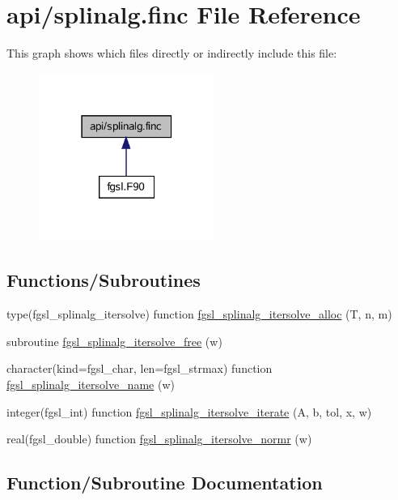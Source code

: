 \hypertarget{splinalg_8finc}{}\section{api/splinalg.finc File Reference}
\label{splinalg_8finc}
This graph shows which files directly or indirectly include this file\+:\nopagebreak
\begin{figure}[H]
\begin{center}
\leavevmode
\includegraphics[width=162pt]{splinalg_8finc__dep__incl}
\end{center}
\end{figure}
\subsection*{Functions/\+Subroutines}
\begin{DoxyCompactItemize}
\item 
type(fgsl\+\_\+splinalg\+\_\+itersolve) function \hyperlink{splinalg_8finc_a8766250bd608e07c616631f63aa4f7d4}{fgsl\+\_\+splinalg\+\_\+itersolve\+\_\+alloc} (T, n, m)
\item 
subroutine \hyperlink{splinalg_8finc_af5c33fc65867faccfca3d77d97bf09c6}{fgsl\+\_\+splinalg\+\_\+itersolve\+\_\+free} (w)
\item 
character(kind=fgsl\+\_\+char, len=fgsl\+\_\+strmax) function \hyperlink{splinalg_8finc_aff2a34f59337673c4505ea7da7d1b231}{fgsl\+\_\+splinalg\+\_\+itersolve\+\_\+name} (w)
\item 
integer(fgsl\+\_\+int) function \hyperlink{splinalg_8finc_a733e162fdb2fc23316909d59f028846e}{fgsl\+\_\+splinalg\+\_\+itersolve\+\_\+iterate} (A, b, tol, x, w)
\item 
real(fgsl\+\_\+double) function \hyperlink{splinalg_8finc_ac561a87afce38805f1632a4a83394156}{fgsl\+\_\+splinalg\+\_\+itersolve\+\_\+normr} (w)
\end{DoxyCompactItemize}


\subsection{Function/\+Subroutine Documentation}
\hypertarget{splinalg_8finc_a8766250bd608e07c616631f63aa4f7d4}{}
